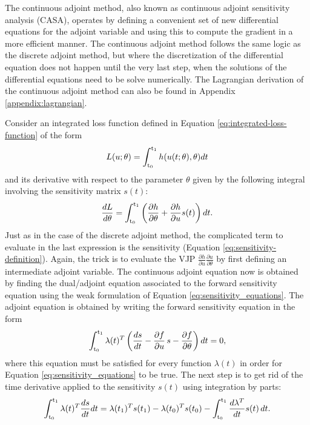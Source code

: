 The continuous adjoint method, also known as continuous adjoint sensitivity analysis (CASA), operates by defining a convenient set of new differential equations for the adjoint variable and using this to compute the gradient in a more efficient manner. 
The continuous adjoint method follows the same logic as the discrete adjoint method, but where the discretization of the differential equation does not happen until the very last step, when the solutions of the differential equations need to be solve numerically. 
The Lagrangian derivation of the continuous adjoint method can also be found in Appendix \ref{appendix:lagrangian}.

Consider an integrated loss function defined in Equation \eqref{eq:integrated-loss-function} of the form 
\begin{equation}
    L(u; \theta) = \operatorname{\int_{t_0}^{t_1}} h(u(t;\theta), \theta) dt
\end{equation}
and its derivative with respect to the parameter $\theta$ given by the following integral involving the sensitivity matrix $s(t)$:
\begin{equation}
    \frac{dL}{d\theta}
    = 
    \operatorname{\int_{t_0}^{t_1}} \left( \frac{\partial h}{\partial \theta} + \frac{\partial h}{\partial u} s(t) \right) dt.
    \label{eq:casa-loss}
\end{equation}
Just as in the case of the discrete adjoint method, the complicated term to evaluate in the last expression is the sensitivity (Equation \eqref{eq:sensitivity-definition}).
Again, the trick is to evaluate the VJP $\frac{\partial h}{\partial u} \frac{\partial u}{\partial \theta}$ by first defining an intermediate adjoint variable. 
The continuous adjoint equation now is obtained by finding the dual/adjoint equation associated to the forward sensitivity equation using the weak formulation of Equation \eqref{eq:sensitivity_equations}. 
The adjoint equation is obtained by writing the forward sensitivity equation in the form 
\begin{equation}
    \operatorname{\int_{t_0}^{t_1}} \lambda(t)^T \left( \frac{ds}{dt} - \frac{\partial f}{\partial u} \, s - \frac{\partial f}{\partial \theta}  \right) dt 
    = 
    0,
    \label{eq:integrated-sensitivity-equation}
\end{equation}
where this equation must be satisfied for every function $\lambda(t)$ in order for Equation \eqref{eq:sensitivity_equations} to be true. 
The next step is to get rid of the time derivative applied to the sensitivity $s(t)$ using integration by parts: 
\begin{equation}
    \operatorname{\int_{t_0}^{t_1}} \lambda(t)^T \frac{ds}{dt} dt
    = 
    \lambda(t_1)^T s(t_1) - \lambda(t_0)^T s(t_0)
    -
    \operatorname{\int_{t_0}^{t_1}} \frac{d\lambda^T}{dt} s(t)\, dt.
\end{equation}
